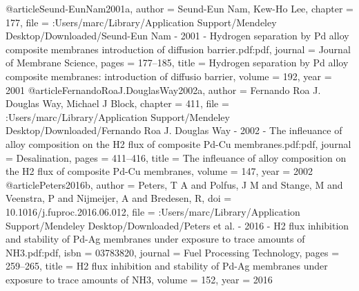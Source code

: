 @article{Seund-EunNam2001a,
author = {{Seund-Eun Nam}, Kew-Ho Lee},
chapter = {177},
file = {:Users/marc/Library/Application Support/Mendeley Desktop/Downloaded/Seund-Eun Nam - 2001 - Hydrogen separation by Pd alloy composite membranes introduction of diffusion barrier.pdf:pdf},
journal = {Journal of Membrane Science},
pages = {177--185},
title = {{Hydrogen separation by Pd alloy composite membranes: introduction of diffusio barrier}},
volume = {192},
year = {2001}
}
@article{FernandoRoaJ.DouglasWay2002a,
author = {{Fernando Roa  J. Douglas Way}, Michael J Block},
chapter = {411},
file = {:Users/marc/Library/Application Support/Mendeley Desktop/Downloaded/Fernando Roa J. Douglas Way - 2002 - The infleuance of alloy composition on the H2 flux of composite Pd-Cu membranes.pdf:pdf},
journal = {Desalination},
pages = {411--416},
title = {{The infleuance of alloy composition on the H2 flux of composite Pd-Cu membranes}},
volume = {147},
year = {2002}
}
@article{Peters2016b,
author = {Peters, T A and Polfus, J M and Stange, M and Veenstra, P and Nijmeijer, A and Bredesen, R},
doi = {10.1016/j.fuproc.2016.06.012},
file = {:Users/marc/Library/Application Support/Mendeley Desktop/Downloaded/Peters et al. - 2016 - H2 flux inhibition and stability of Pd-Ag membranes under exposure to trace amounts of NH3.pdf:pdf},
isbn = {03783820},
journal = {Fuel Processing Technology},
pages = {259--265},
title = {{H2 flux inhibition and stability of Pd-Ag membranes under exposure to trace amounts of NH3}},
volume = {152},
year = {2016}
}
